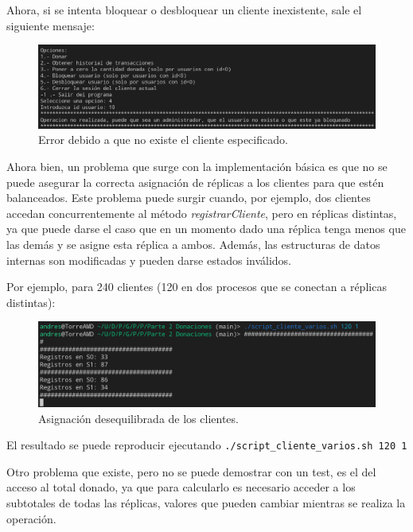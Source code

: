 \documentclass{article}
\begin{document}
Ahora, si se intenta bloquear o desbloquear un cliente inexistente, sale el siguiente mensaje:
\begin{figure}[H]
    \centering
    \includegraphics[width=\textwidth]{imagenes/bloqueo/6.png}
    \caption{Error debido a que no existe el cliente especificado.}
\end{figure}


Ahora bien, un problema que surge con la implementación básica es que no se puede asegurar la correcta asignación de réplicas a los clientes para que estén balanceados. Este problema puede surgir cuando, por ejemplo, dos clientes accedan concurrentemente al método \textit{registrarCliente}, pero en réplicas distintas, ya que puede darse el caso que en un momento dado una réplica tenga menos que las demás y se asigne esta réplica a ambos. Además, las estructuras de datos internas son modificadas y pueden darse estados inválidos.

\bigskip

Por ejemplo, para 240 clientes (120 en dos procesos que se conectan a réplicas distintas):

\begin{figure}[H]
    \centering
    \includegraphics[width=\textwidth]{imagenes/varios/incorrecto.png}
    \caption{Asignación desequilibrada de los clientes.}
\end{figure}

El resultado se puede reproducir ejecutando \verb|./script_cliente_varios.sh 120 1|

\bigskip

Otro problema que existe, pero no se puede demostrar con un test, es el del acceso al total donado, ya que para calcularlo es necesario acceder a los subtotales de todas las réplicas, valores que pueden cambiar mientras se realiza la operación.
\end{document}
